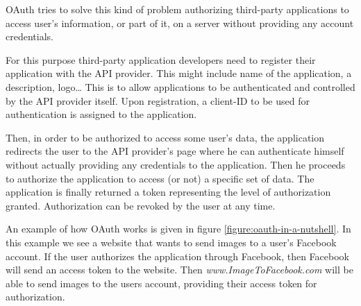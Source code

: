 OAuth tries to solve this kind of problem authorizing third-party applications to access
user's information, or part of it, on a server without providing any account credentials.

For this purpose third-party application developers need to register their application
with the API provider. This might include name of the application, a description, logo\ldots
This is to allow applications to be authenticated and controlled by the API provider itself.
Upon registration, a client-ID to be used for authentication is assigned to the application.

Then, in order to be authorized to access some user's data, the application redirects the
user to the API provider's page where he can authenticate himself without actually providing
any credentials to the application. Then he proceeds to authorize the application to access (or not)
a specific set of data. The application is finally returned a token representing the level
of authorization granted. Authorization can be revoked by the user at any time.

An example of how OAuth works is given in figure \ref{figure:oauth-in-a-nutshell}.
In this example we see a website that wants to send images to a user's Facebook account.
If the user authorizes the application through Facebook, then Facebook will send an access
token to the website. Then \textit{www.ImageToFacebook.com} will be able to send images to the
users account, providing their access token for authorization.

